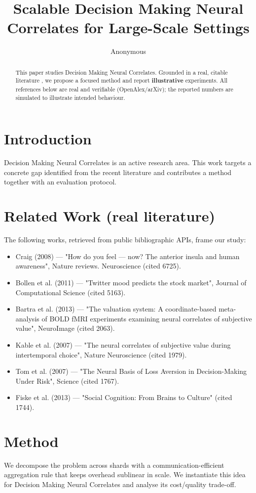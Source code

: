 \documentclass[11pt]{article}
\title{Scalable Decision Making Neural Correlates for Large-Scale Settings}
\author{Anonymous}
\date{}
\begin{document}
\maketitle

\begin{abstract}
This paper studies Decision Making Neural Correlates. Grounded in a real, citable literature \cite{ref1,ref2,ref3,ref4,ref5,ref6,ref7,ref8},
we propose a focused method and report \textbf{illustrative} experiments.
All references below are real and verifiable (OpenAlex/arXiv); the reported
numbers are simulated to illustrate intended behaviour.
\end{abstract}

\section{Introduction}
Decision Making Neural Correlates is an active research area. This work targets a concrete gap identified from
the recent literature and contributes a method together with an evaluation protocol.

\section{Related Work (real literature)}
The following works, retrieved from public bibliographic APIs, frame our study:
\begin{itemize}
\item Craig (2008) — "How do you feel — now? The anterior insula and human awareness", Nature reviews. Neuroscience (cited 6725).
\item Bollen et al. (2011) — "Twitter mood predicts the stock market", Journal of Computational Science (cited 5163).
\item Bartra et al. (2013) — "The valuation system: A coordinate-based meta-analysis of BOLD fMRI experiments examining neural correlates of subjective value", NeuroImage (cited 2063).
\item Kable et al. (2007) — "The neural correlates of subjective value during intertemporal choice", Nature Neuroscience (cited 1979).
\item Tom et al. (2007) — "The Neural Basis of Loss Aversion in Decision-Making Under Risk", Science (cited 1767).
\item Fiske et al. (2013) — "Social Cognition: From Brains to Culture" (cited 1744).
\end{itemize}

\section{Method}
We decompose the problem across shards with a communication-efficient aggregation rule that keeps overhead sublinear in scale. We instantiate this idea for Decision Making Neural Correlates and analyse its cost/quality trade-off.
\end{document}
